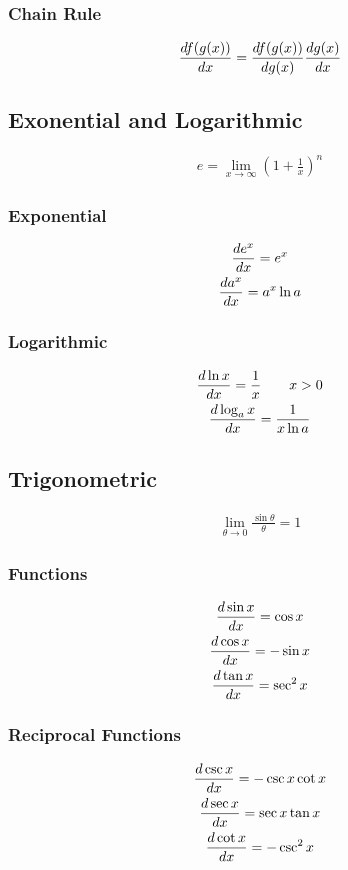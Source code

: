 \documentclass[12pt]{article}
\begin{document}
			\subsubsection{Chain Rule}
				\begin{gather}
					\deriv{f(g(x))} =
					\deriv[g(x)]{f(g(x))}\deriv{g(x)}
				\end{gather}
		\subsection{Exonential and Logarithmic}
			\begin{gather}
				e = \lim_{x \to \infty} \left(1 +
				\frac{1}{x}\right)^n
			\end{gather}
			\subsubsection{Exponential}
				\begin{gather}
					\deriv{e^x} = e^x \\
					\deriv{a^x} = a^x\ln a
				\end{gather}
			\subsubsection{Logarithmic}
				\begin{gather}
					\deriv{\ln x} = \frac{1}{x} \qquad x > 0 \\
					\deriv{\log_ax} = \frac{1}{x\ln a}
				\end{gather}
		\subsection{Trigonometric}
			\begin{gather}
				\lim_{\theta \to 0} \frac{\sin \theta}{\theta} =
				1
			\end{gather}
			\subsubsection{Functions}
				\begin{gather}
					\deriv{\sin x} = \cos x \\
					\deriv{\cos x} = -\sin x \\
					\deriv{\tan x} = \sec^2 x
				\end{gather}
			\subsubsection{Reciprocal Functions}
				\begin{gather}
					\deriv{\csc x} = -\csc x \cot x \\
					\deriv{\sec x} = \sec x \tan x \\
					\deriv{\cot x} = -\csc^2 x
				\end{gather}
\end{document}
